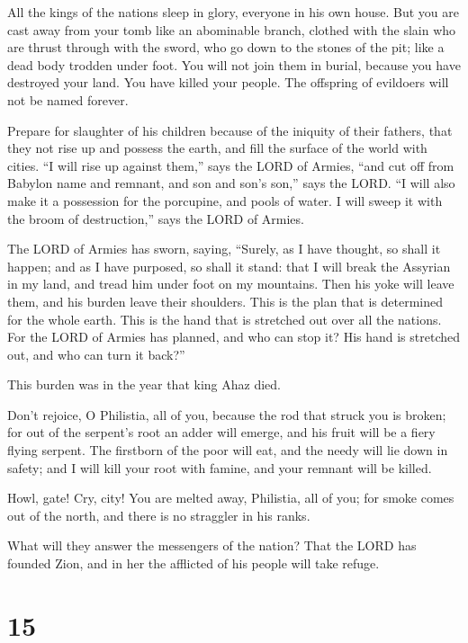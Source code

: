  All the kings of the nations sleep in glory, everyone in
his own house.  But you are cast away from your tomb like
an abominable branch, clothed with the slain who are thrust through with
the sword, who go down to the stones of the pit; like a dead body
trodden under foot.  You will not join them in burial,
because you have destroyed your land. You have killed your people. The
offspring of evildoers will not be named forever.

 Prepare for slaughter of his children because of the
iniquity of their fathers, that they not rise up and possess the earth,
and fill the surface of the world with cities.  ``I will
rise up against them,'' says the LORD of Armies, ``and cut off from
Babylon name and remnant, and son and son's son,'' says the LORD.
 ``I will also make it a possession for the porcupine, and
pools of water. I will sweep it with the broom of destruction,'' says
the LORD of Armies.

 The LORD of Armies has sworn, saying, ``Surely, as I have
thought, so shall it happen; and as I have purposed, so shall it stand:
 that I will break the Assyrian in my land, and tread him
under foot on my mountains. Then his yoke will leave them, and his
burden leave their shoulders.  This is the plan that is
determined for the whole earth. This is the hand that is stretched out
over all the nations.  For the LORD of Armies has planned,
and who can stop it? His hand is stretched out, and who can turn it
back?''

 This burden was in the year that king Ahaz died.

 Don't rejoice, O Philistia, all of you, because the rod
that struck you is broken; for out of the serpent's root an adder will
emerge, and his fruit will be a fiery flying serpent.  The
firstborn of the poor will eat, and the needy will lie down in safety;
and I will kill your root with famine, and your remnant will be killed.

 Howl, gate! Cry, city! You are melted away, Philistia, all
of you; for smoke comes out of the north, and there is no straggler in
his ranks.

 What will they answer the messengers of the nation? That
the LORD has founded Zion, and in her the afflicted of his people will
take refuge.

\hypertarget{section-14}{%
\section{15}\label{section-14}}

